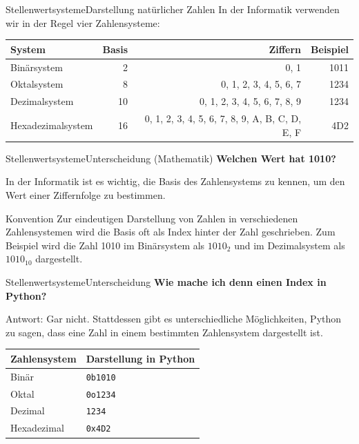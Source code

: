 \documentclass[xelatex,aspectratio=169]{beamer}
\begin{document}
\begin{frame}{Stellenwertsysteme}{Darstellung natürlicher Zahlen}
  In der Informatik verwenden wir in der Regel vier Zahlensysteme:
  \begin{table}
    \begin{tabular}{lrrr}
      \toprule
      System            & Basis & Ziffern                                        & Beispiel \\
      \midrule
      Binärsystem       & 2     & 0, 1                                           & 1011     \\
      Oktalsystem       & 8     & 0, 1, 2, 3, 4, 5, 6, 7                         & 1234     \\
      Dezimalsystem     & 10    & 0, 1, 2, 3, 4, 5, 6, 7, 8, 9                   & 1234     \\
      Hexadezimalsystem & 16    & 0, 1, 2, 3, 4, 5, 6, 7, 8, 9, A, B, C, D, E, F & 4D2      \\
      \bottomrule
    \end{tabular}
  \end{table}
\end{frame}

\begin{frame}{Stellenwertsysteme}{Unterscheidung (Mathematik)}
  \textbf{Welchen Wert hat 1010?}

  In der Informatik ist es wichtig, die Basis des Zahlensystems zu kennen, um den Wert einer Ziffernfolge zu bestimmen.

  \begin{block}{Konvention}
    Zur eindeutigen Darstellung von Zahlen in verschiedenen Zahlensystemen wird die Basis oft als Index hinter der Zahl geschrieben. Zum Beispiel wird die Zahl 1010 im Binärsystem als $1010_2$ und im Dezimalsystem als $1010_{10}$ dargestellt.
  \end{block}

\end{frame}

\begin{frame}{Stellenwertsysteme}{Unterscheidung}
  \textbf{Wie mache ich denn einen Index in Python?}

  Antwort: Gar nicht. Stattdessen gibt es unterschiedliche Möglichkeiten, Python zu sagen, dass eine Zahl in einem bestimmten Zahlensystem dargestellt ist.

  \begin{table}
    \begin{tabular}{ll}
      \toprule
      Zahlensystem & Darstellung in Python \\
      \midrule
      Binär        & \texttt{0b1010}       \\
      Oktal        & \texttt{0o1234}       \\
      Dezimal      & \texttt{1234}         \\
      Hexadezimal  & \texttt{0x4D2}        \\
      \bottomrule
    \end{tabular}
  \end{table}
\end{frame}
\end{document}
